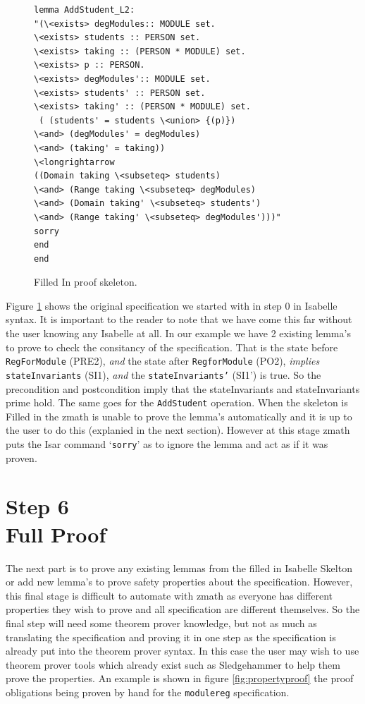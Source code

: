 \begin{figure}[H]
\begin{minipage}{0.45\textwidth}
\begin{scriptsize}
\begin{BVerbatim}
lemma AddStudent_L2:
"(\<exists> degModules:: MODULE set.
\<exists> students :: PERSON set.
\<exists> taking :: (PERSON * MODULE) set.
\<exists> p :: PERSON.
\<exists> degModules':: MODULE set.
\<exists> students' :: PERSON set.
\<exists> taking' :: (PERSON * MODULE) set.
 ( (students' = students \<union> {(p)}) 
\<and> (degModules' = degModules) 
\<and> (taking' = taking))
\<longrightarrow
((Domain taking \<subseteq> students)
\<and> (Range taking \<subseteq> degModules)
\<and> (Domain taking' \<subseteq> students')
\<and> (Range taking' \<subseteq> degModules')))"
sorry
end
end
\end{BVerbatim}
\end{scriptsize}
\end{minipage}
\caption{Filled In proof skeleton. \label{fig:fillinFullexample}}
\end{figure}

Figure \ref{fig:fillinFullexample} shows the original specification we started with in step 0 in Isabelle syntax. It is important to the reader to note that we have come this far without the user knowing any Isabelle at all. In our example we have 2 existing lemma's to prove to check the consitancy of the specification. That is the state before \texttt{RegForModule} (PRE2), \emph{and} the state after \texttt{RegforModule} (PO2), \emph{implies} \texttt{stateInvariants} (SI1), \emph{and} the \texttt{stateInvariants'} (SI1') is true. So the precondition and postcondition imply that the stateInvariants and stateInvariants prime hold. The same goes for the \texttt{AddStudent} operation. When the skeleton is Filled in the \gls{zmath} is unable to prove the lemma's automatically and it is up to the user to do this (explanied in the next section). However at this stage \gls{zmath} puts the Isar command `\texttt{sorry}' as to ignore the lemma and act as if it was proven.

\section{Step 6\\Full Proof}

The next part is to prove any existing lemmas from the filled in Isabelle Skelton or add new lemma's to prove safety properties about the specification. However, this final stage is difficult to automate with \gls{zmath} as everyone has different properties they wish to prove and all specification are different themselves. So the final step will need some theorem prover knowledge, but not as much as translating the specification and proving it in one step as the specification is already put into the theorem prover syntax. In this case the user may wish to use theorem prover tools which already exist such as Sledgehammer \cite{sledgehammer} to help them prove the properties. An example is shown in figure \ref{fig:propertyproof} the proof obligations being proven by hand for the \texttt{modulereg} specification.

